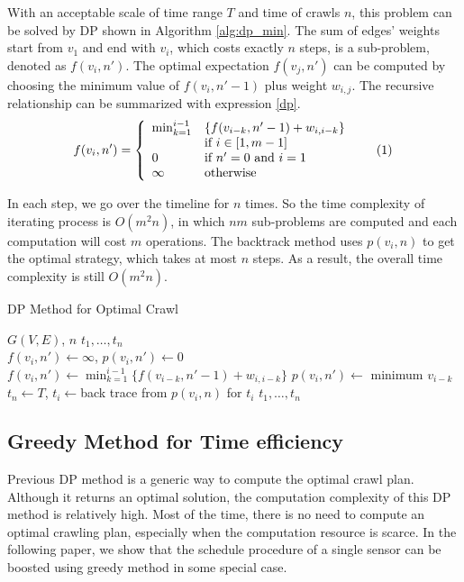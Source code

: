 \documentclass[conference]{IEEEtran}
\newcommand\numberthis{\addtocounter{equation}{1}\tag{\theequation}}
\begin{document}
With an acceptable scale of time range $T$ and time of crawls $n$, this problem can be solved by DP shown in Algorithm \ref{alg:dp_min}. 
The sum of edges' weights start from $v_1$ and end with $v_i$, which costs exactly $n$ steps, is a sub-problem, denoted as $f(v_i,n')$.
The optimal expectation $f(v_j, n')$ can be computed by choosing the minimum value of $f(v_i, n'-1)$ plus weight $w_{i,j}$. 
The recursive relationship can be summarized with expression \eqref{dp}.
\[
f(v_i, n')=\left\{
\begin{array}{ll}
\min_{k=1}^{i-1} & \{f(v_{i-k}, n'-1)+w_{i,i-k}\}\\
& \text{if } i\in[1, m-1]\\
0 & \text{if } n'=0 \text{ and } i=1\\
\infty & \text{otherwise}
\end{array}\numberthis \label{dp}
\right.
\]

In each step, we go over the timeline for $n$ times.
So the time complexity of iterating process is $O(m^2n)$, in which $nm$ sub-problems are computed and each computation will cost $m$ operations. 
The backtrack method uses $p(v_i, n)$ to get the optimal strategy, which takes at most $n$ steps. 
As a result, the overall time complexity is still $O(m^2n)$.
\begin{algorithm}
\caption{DP Method for Optimal Crawl}
\label{alg:dp_min}
\begin{algorithmic}[1]
	\renewcommand{\algorithmicrequire}{\textbf{Input:}}
	\renewcommand{\algorithmicensure}{\textbf{Output:}}
	\REQUIRE $G(V,E)$, $n$
	\ENSURE  $t_1,\ldots,t_n$
	\\
	\STATE $f(v_i,n') \gets \infty$, $p(v_i,n')\gets 0$
	\STATE $f(v_i,n')\gets\min_{k=1}^{i-1}\{f(v_{i-k}, n'-1)+w_{i,i-k}\}$
	\STATE $p(v_i,n')\gets$ minimum $v_{i-k}$
	\ENDFOR
	\ENDFOR
	\STATE $t_n\gets T$, $t_i\gets$back trace from $p(v_i, n)$ for $t_i$
	\RETURN $t_1,\ldots,t_n$
\end{algorithmic}
\end{algorithm}

\subsection{Greedy Method for Time efficiency}

Previous DP method is a generic way to compute the optimal crawl plan. 
Although it returns an optimal solution, the computation complexity of this DP method is relatively high.
Most of the time, there is no need to compute an optimal crawling plan, especially when the computation resource is scarce.
In the following paper, we show that the schedule procedure of a single sensor can be boosted using greedy method in some special case.
\end{document}
